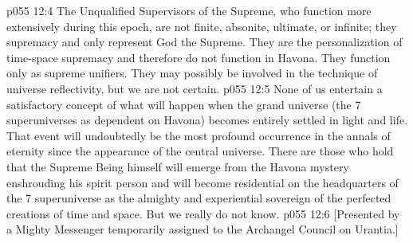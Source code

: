\vs p055 12:4 The Unqualified Supervisors of the Supreme, who function more extensively during this epoch, are not finite, absonite, ultimate, or infinite; they  supremacy and only represent God the Supreme. They are the personalization of time\hyp{}space supremacy and therefore do not function in Havona. They function only as supreme unifiers. They may possibly be involved in the technique of universe reflectivity, but we are not certain.
\vs p055 12:5 \pc None of us entertain a satisfactory concept of what will happen when the grand universe (the 7 superuniverses as dependent on Havona) becomes entirely settled in light and life. That event will undoubtedly be the most profound occurrence in the annals of eternity since the appearance of the central universe. There are those who hold that the Supreme Being himself will emerge from the Havona mystery enshrouding his spirit person and will become residential on the headquarters of the 7 superuniverse as the almighty and experiential sovereign of the perfected creations of time and space. But we really do not know.
\vsetoff
\vs p055 12:6 [Presented by a Mighty Messenger temporarily assigned to the Archangel Council on Urantia.]
